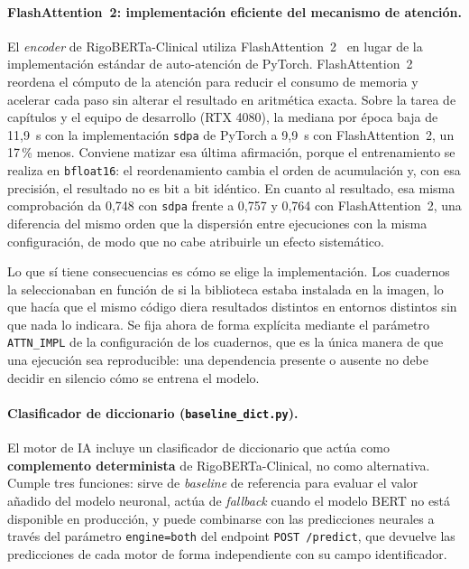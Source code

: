 \paragraph{FlashAttention~2: implementación eficiente del mecanismo de atención.}
El \emph{encoder} de RigoBERTa-Clinical utiliza FlashAttention~2~\cite{dao2023flashattention2} en lugar de la implementación estándar de auto-atención de PyTorch. FlashAttention~2 reordena el cómputo de la atención para reducir el consumo de memoria y acelerar cada paso sin alterar el resultado en aritmética exacta. Sobre la tarea de capítulos y el equipo de desarrollo (RTX 4080), la mediana por época baja de 11,9~s con la implementación \texttt{sdpa} de PyTorch a 9,9~s con FlashAttention~2, un 17\,\% menos. Conviene matizar esa última afirmación, porque el entrenamiento se realiza en \texttt{bfloat16}: el reordenamiento cambia el orden de acumulación y, con esa precisión, el resultado no es bit a bit idéntico. En cuanto al resultado, esa misma comprobación da 0,748 con \texttt{sdpa} frente a 0,757 y 0,764 con FlashAttention~2, una diferencia del mismo orden que la dispersión entre ejecuciones con la misma configuración, de modo que no cabe atribuirle un efecto sistemático.

Lo que sí tiene consecuencias es cómo se elige la implementación. Los cuadernos la seleccionaban en función de si la biblioteca estaba instalada en la imagen, lo que hacía que el mismo código diera resultados distintos en entornos distintos sin que nada lo indicara. Se fija ahora de forma explícita mediante el parámetro \texttt{ATTN\_IMPL} de la configuración de los cuadernos, que es la única manera de que una ejecución sea reproducible: una dependencia presente o ausente no debe decidir en silencio cómo se entrena el modelo.

\paragraph{Clasificador de diccionario (\texttt{baseline\_dict.py}).}
\label{sec:diccionario}
El motor de IA incluye un clasificador de diccionario que actúa como \textbf{complemento determinista} de RigoBERTa-Clinical, no como alternativa. Cumple tres funciones: sirve de \emph{baseline} de referencia para evaluar el valor añadido del modelo neuronal, actúa de \emph{fallback} cuando el modelo BERT no está disponible en producción, y puede combinarse con las predicciones neurales a través del parámetro \texttt{engine=\textquotedbl{}both\textquotedbl{}} del endpoint \texttt{POST /predict}, que devuelve las predicciones de cada motor de forma independiente con su campo identificador.

